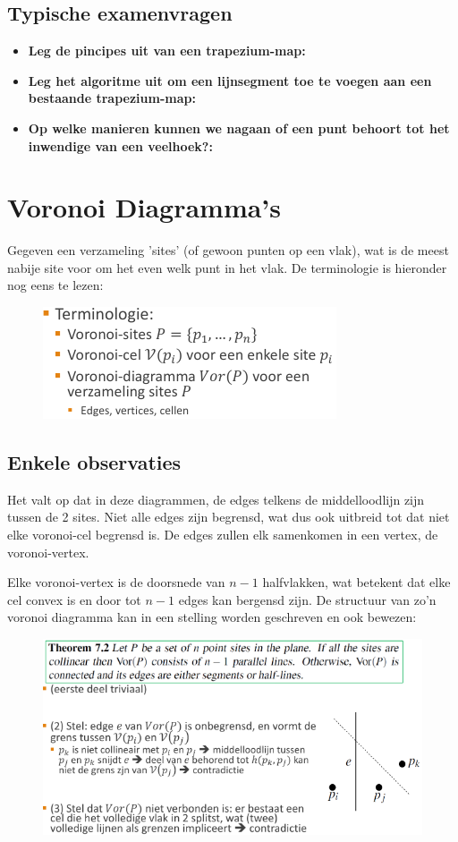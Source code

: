 \documentclass[12pt,a4paper]{article}
\begin{document}
	
	\subsection{Typische examenvragen}
	\begin{itemize}
		\item \textbf{Leg de pincipes uit van een trapezium-map:}\\
		\item \textbf{Leg het algoritme uit om een lijnsegment toe te voegen aan een bestaande trapezium-map:}\\
		\item \textbf{Op welke manieren kunnen we nagaan of een punt behoort tot het inwendige van een veelhoek?:}\\
	\end{itemize}
	
	
	\section{Voronoi Diagramma's}
	Gegeven een verzameling 'sites' (of gewoon punten op een vlak), wat is de meest nabije site voor om het even welk punt in het vlak. De terminologie is hieronder nog eens te lezen: 
	\begin{figure}[H]
		\includegraphics[width=0.4\linewidth]{afbeeldingen/voronoi/terminologei}
		\label{fig:terminologei}
	\end{figure}
	
	
	\subsection{Enkele observaties}
	Het valt op dat in deze diagrammen, de edges telkens de middelloodlijn zijn tussen de 2 sites. Niet alle edges zijn begrensd, wat dus ook uitbreid tot dat niet elke voronoi-cel begrensd is. De edges zullen elk samenkomen in een vertex, de voronoi-vertex. 
	
	Elke voronoi-vertex is de doorsnede van $n-1$ halfvlakken, wat betekent dat elke cel convex is en door tot $n-1$ edges kan bergensd zijn. De structuur van zo'n voronoi diagramma kan in een stelling worden geschreven en ook bewezen: 
	\begin{figure}[H]
		\centering
		\includegraphics[width=0.8\linewidth]{afbeeldingen/voronoi/structuur}
		\label{fig:structuur}
	\end{figure}
	
\end{document}
